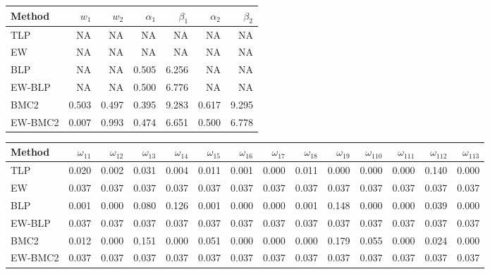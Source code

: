 \documentclass[
]{article}
\begin{document}
\begin{tabular}{lrrrrrr}
\toprule
Method & $w_1$ & $w_2$ & $\alpha_1$ & $\beta_1$ & $\alpha_2$ & $\beta_2$\\
\midrule
TLP & NA & NA & NA & NA & NA & NA\\
EW & NA & NA & NA & NA & NA & NA\\
BLP & NA & NA & 0.505 & 6.256 & NA & NA\\
EW-BLP & NA & NA & 0.500 & 6.776 & NA & NA\\
BMC2 & 0.503 & 0.497 & 0.395 & 9.283 & 0.617 & 9.295\\
EW-BMC2 & 0.007 & 0.993 & 0.474 & 6.651 & 0.500 & 6.778\\
\bottomrule
\end{tabular}

\begin{tabular}{lrrrrrrrrrrrrr}
\toprule
Method & $\omega_{11}$ & $\omega_{12}$ & $\omega_{13}$ & $\omega_{14}$ & $\omega_{15}$ & $\omega_{16}$ & $\omega_{17}$ & $\omega_{18}$ & $\omega_{19}$ & $\omega_{110}$ & $\omega_{111}$ & $\omega_{112}$ & $\omega_{113}$\\
\midrule
TLP & 0.020 & 0.002 & 0.031 & 0.004 & 0.011 & 0.001 & 0.000 & 0.011 & 0.000 & 0.000 & 0.000 & 0.140 & 0.000\\
EW & 0.037 & 0.037 & 0.037 & 0.037 & 0.037 & 0.037 & 0.037 & 0.037 & 0.037 & 0.037 & 0.037 & 0.037 & 0.037\\
BLP & 0.001 & 0.000 & 0.080 & 0.126 & 0.001 & 0.000 & 0.000 & 0.001 & 0.148 & 0.000 & 0.000 & 0.039 & 0.000\\
EW-BLP & 0.037 & 0.037 & 0.037 & 0.037 & 0.037 & 0.037 & 0.037 & 0.037 & 0.037 & 0.037 & 0.037 & 0.037 & 0.037\\
BMC2 & 0.012 & 0.000 & 0.151 & 0.000 & 0.051 & 0.000 & 0.000 & 0.000 & 0.179 & 0.055 & 0.000 & 0.024 & 0.000\\
EW-BMC2 & 0.037 & 0.037 & 0.037 & 0.037 & 0.037 & 0.037 & 0.037 & 0.037 & 0.037 & 0.037 & 0.037 & 0.037 & 0.037\\
\bottomrule
\end{tabular}
\end{document}

